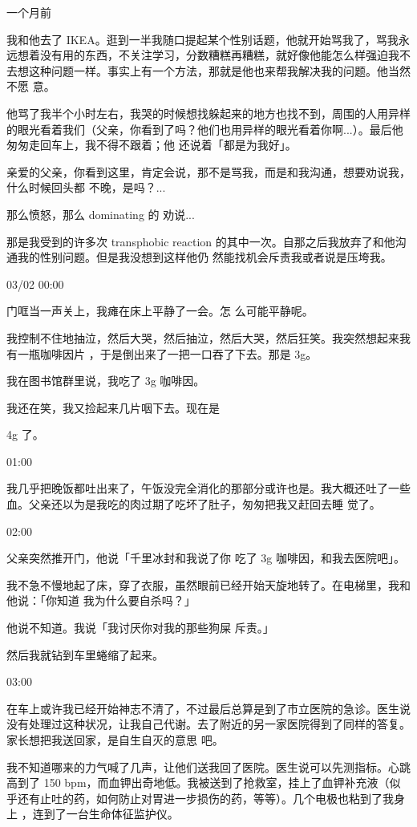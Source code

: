 \documentclass{article}
\begin{document}
一个月前 

我和他去了 IKEA。逛到一半我随口提起某个性别话题，他就开始骂我了，骂我永远想着没有用的东西，不关注学习，分数糟糕再糟糕，就好像他能怎么样强迫我不去想这种问题一样。事实上有一个方法，那就是他也来帮我解决我的问题。他当然不愿
意。 

他骂了我半个小时左右，我哭的时候想找躲起来的地方也找不到，周围的人用异样的眼光看着我们（父亲，你看到了吗？他们也用异样的眼光看着你啊...）。最后他匆匆走回车上，我不得不跟着；他
还说着「都是为我好」。 

亲爱的父亲，你看到这里，肯定会说，那不是骂我，而是和我沟通，想要劝说我，什么时候回头都
不晚，是吗？... 

\newpage

那么愤怒，那么 dominating 的
劝说... 

那是我受到的许多次 transphobic reaction 的其中一次。自那之后我放弃了和他沟通我的性别问题。但是我没想到这样他仍
然能找机会斥责我或者说是压垮我。 


03/02 00:00 

门哐当一声关上，我瘫在床上平静了一会。怎
么可能平静呢。 

我控制不住地抽泣，然后大哭，然后抽泣，然后大哭，然后狂笑。我突然想起来我有一瓶咖啡因片
，于是倒出来了一把一口吞了下去。那是 3g。 

我在图书馆群里说，我吃了 3g 咖啡因。
 

我还在笑，我又捡起来几片咽下去。现在是 
\newpage

4g 了。 


01:00 

我几乎把晚饭都吐出来了，午饭没完全消化的那部分或许也是。我大概还吐了一些血。父亲还以为是我吃的肉过期了吃坏了肚子，匆匆把我又赶回去睡
觉了。 


02:00 

父亲突然推开门，他说「千里冰封和我说了你
吃了 3g 咖啡因，和我去医院吧」。 

我不急不慢地起了床，穿了衣服，虽然眼前已经开始天旋地转了。在电梯里，我和他说：「你知道
我为什么要自杀吗？」 

他说不知道。我说「我讨厌你对我的那些狗屎
斥责。」 

\newpage


然后我就钻到车里蜷缩了起来。 


03:00 

在车上或许我已经开始神志不清了，不过最后总算是到了市立医院的急诊。医生说没有处理过这种状况，让我自己代谢。去了附近的另一家医院得到了同样的答复。家长想把我送回家，是自生自灭的意思
吧。 

我不知道哪来的力气喊了几声，让他们送我回了医院。医生说可以先测指标。心跳高到了 150 bpm，而血钾出奇地低。我被送到了抢救室，挂上了血钾补充液（似乎还有止吐的药，如何防止对胃进一步损伤的药，等等）。几个电极也粘到了我身上
，连到了一台生命体征监护仪。 
\end{document}
